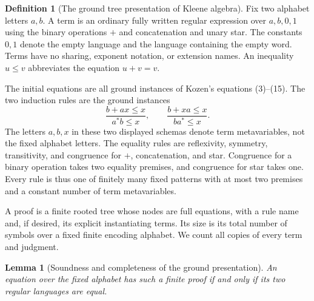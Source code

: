 \documentclass[11pt]{article}
\newtheorem{lemma}[theorem]{Lemma}
\theoremstyle{definition}
\newtheorem{definition}[theorem]{Definition}
\theoremstyle{remark}
\begin{document}
\begin{definition}[The ground tree presentation of Kleene algebra]
\label{def:tree-ka}
Fix two alphabet letters $a,b$. A term is an ordinary fully written
regular expression over $a,b,0,1$ using the binary operations $+$
and concatenation and unary star. The constants $0,1$ denote the
empty language and the language containing the empty word.
Terms have no sharing, exponent notation, or extension names.
An inequality $u\le v$ abbreviates the equation $u+v=v$.

The initial equations are all ground instances of Kozen's
equations (3)--(15). The two induction rules are the ground instances
\[
 \frac{b+ax\le x}{a^*b\le x},
 \qquad
 \frac{b+xa\le x}{ba^*\le x}.
\]
The letters $a,b,x$ in these two displayed schemas denote term
metavariables, not the fixed alphabet letters. The equality rules
are reflexivity, symmetry, transitivity, and congruence for $+$,
concatenation, and star. Congruence for a binary operation takes two
equality premises, and congruence for star takes one. Every rule is
thus one of finitely many fixed patterns with at most two premises
and a constant number of term metavariables.

A proof is a finite rooted tree whose nodes are full equations,
with a rule name and, if desired, its explicit instantiating terms.
Its size is its total number of symbols over a fixed finite encoding
alphabet. We count all copies of every term and judgment.
\end{definition}

\begin{lemma}[Soundness and completeness of the ground presentation]
\label{lem:tree-ka-complete}
An equation over the fixed alphabet has such a finite proof if and
only if its two regular languages are equal.
\end{lemma}
\end{document}
